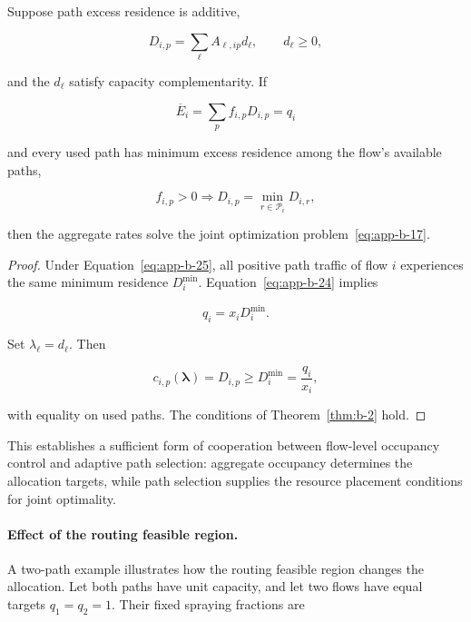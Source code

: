 \begin{corollary}
\label{cor:b-1}
Suppose path excess residence is additive,

\begin{equation}
\label{eq:app-b-23}
D_{i,p}=\sum_\ell A_{\ell,ip}d_\ell,
\qquad d_\ell\ge0,
\end{equation}

and the \(d_\ell\) satisfy capacity complementarity. If

\begin{equation}
\label{eq:app-b-24}
\overline E_i=\sum_p f_{i,p}D_{i,p}=q_i
\end{equation}

and every used path has minimum excess residence among the flow's available paths,

\begin{equation}
\label{eq:app-b-25}
f_{i,p}>0
\Longrightarrow
D_{i,p}=\min_{r\in\mathcal P_i}D_{i,r},
\end{equation}

then the aggregate rates solve the joint optimization problem~\eqref{eq:app-b-17}.
\end{corollary}

\begin{proof} Under Equation~\eqref{eq:app-b-25}, all positive path traffic of flow \(i\) experiences the same minimum residence \(D_i^{\min}\). Equation~\eqref{eq:app-b-24} implies

\[
q_i=x_iD_i^{\min}.
\]

Set \(\lambda_\ell=d_\ell\). Then

\[
c_{i,p}(\boldsymbol\lambda)=D_{i,p}
\ge D_i^{\min}=\frac{q_i}{x_i},
\]

with equality on used paths. The conditions of Theorem~\ref{thm:b-2} hold.
\end{proof}

This establishes a sufficient form of cooperation between flow-level occupancy control and adaptive path selection: aggregate occupancy determines the allocation targets, while path selection supplies the resource placement conditions for joint optimality.

\paragraph{Effect of the routing feasible region.}

A two-path example illustrates how the routing feasible region changes the allocation. Let both paths have unit capacity, and let two flows have equal targets \(q_1=q_2=1\). Their fixed spraying fractions are

